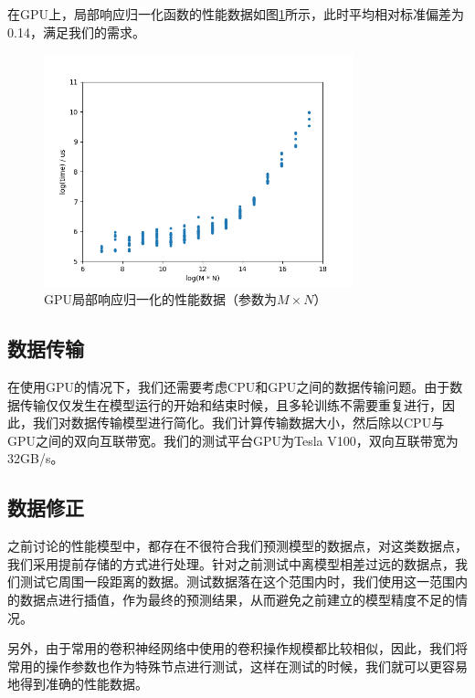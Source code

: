     在GPU上，局部响应归一化函数的性能数据如图\ref{fig:lrn_gpu}所示，此时平均相对标准偏差为0.14，满足我们的需求。

    \begin{figure}[!htbp]
        \centering
        \includegraphics[width=0.8\textwidth]{figures/lrn_gpu.png}
        \caption{GPU局部响应归一化的性能数据（参数为$ M \times N $）}
        \label{fig:lrn_gpu}
    \end{figure}

\subsection{数据传输}
    在使用GPU的情况下，我们还需要考虑CPU和GPU之间的数据传输问题。由于数据传输仅仅发生在模型运行的开始和结束时候，且多轮训练不需要重复进行，因此，我们对数据传输模型进行简化。我们计算传输数据大小，然后除以CPU与GPU之间的双向互联带宽。我们的测试平台GPU为Tesla V100，双向互联带宽为32GB/s。

\subsection{数据修正}
    之前讨论的性能模型中，都存在不很符合我们预测模型的数据点，对这类数据点，我们采用提前存储的方式进行处理。针对之前测试中离模型相差过远的数据点，我们测试它周围一段距离的数据。测试数据落在这个范围内时，我们使用这一范围内的数据点进行插值，作为最终的预测结果，从而避免之前建立的模型精度不足的情况。
    
    另外，由于常用的卷积神经网络中使用的卷积操作规模都比较相似，因此，我们将常用的操作参数也作为特殊节点进行测试，这样在测试的时候，我们就可以更容易地得到准确的性能数据。
    